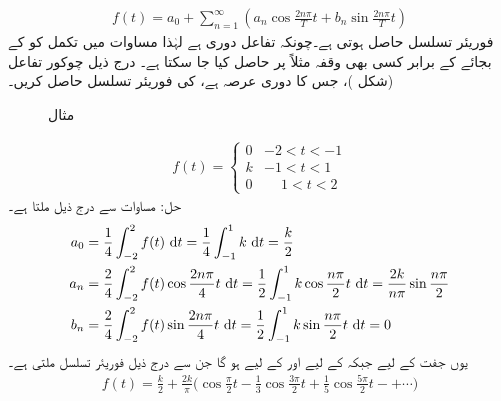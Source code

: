 \begin{align}\label{مساوات_فوریئر_عمومی}
f(t)=a_0+\sum_{n=1}^{\infty} (a_n\cos \frac{2n\pi}{T}t+b_n\sin\frac{2n\pi}{T}t)
\end{align}
فوریئر تسلسل حاصل ہوتی ہے۔چونکہ تفاعل  دوری ہے لہٰذا مساوات  میں تکمل کو  کے بجائے  کے برابر کسی بھی وقفہ مثلاً   پر حاصل کیا جا سکتا ہے۔
\quad درج ذیل چوکور تفاعل (شکل )، جس کا دوری عرصہ  ہے، کی فوریئر تسلسل حاصل کریں۔
\begin{figure}
\centering
{}
\caption{مثال }
\label{شکل_مثال_فوریئر_عمومی_چکور}
\end{figure}
%
\begin{align*}
f(t)=
\begin{cases}
0& -2<t<-1\\
k&-1<t<1\\
0&\phantom{-}1<t<2
\end{cases}
\end{align*}
حل: مساوات  سے درج ذیل ملتا ہے۔
\begin{align*}
a_0&=\frac{1}{4}\int_{-2}^{2} f(t)\,\dif t=\frac{1}{4}\int_{-1}^{1}k\,\dif t=\frac{k}{2}\\
a_n&=\frac{2}{4}\int_{-2}^{2}f(t)\cos\frac{2n\pi}{4}t\, \dif t=\frac{1}{2}\int_{-1}^{1} k \cos \frac{n\pi}{2}t\,\dif t=\frac{2k}{n\pi}\sin \frac{n\pi}{2}\\
b_n&=\frac{2}{4}\int_{-2}^{2}f(t)\sin\frac{2n\pi}{4}t\,\dif t=\frac{1}{2}\int_{-1}^{1} k \sin \frac{n\pi}{2}t\,\dif t=0
\end{align*}
یوں جفت  کے لیے  جبکہ  کے لیے  اور  کے لیے  ہو گا جن سے درج ذیل فوریئر تسلسل ملتی ہے۔
\begin{align*}
f(t)=\frac{k}{2}+\frac{2k}{\pi}\big(\cos \frac{\pi}{2}t-\frac{1}{3}\cos \frac{3\pi}{2}t+\frac{1}{5}\cos \frac{5\pi}{2}t-+\cdots\big)
\end{align*}
